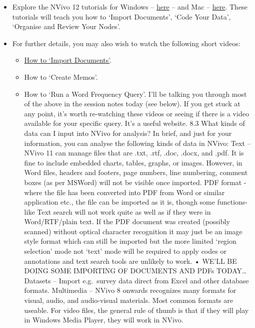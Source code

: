 \documentclass[
]{book}
\providecommand{\tightlist}{%
  \setlength{\itemsep}{0pt}\setlength{\parskip}{0pt}}
\begin{document}
\begin{itemize}
\item
  Explore the NVivo 12 tutorials for Windows -- \href{https://www.qsrinternational.com/nvivo/nvivo-12-tutorial-windows/00-let-s-get-started}{here} -- and Mac -- \href{https://www.qsrinternational.com/nvivo/nvivo-12-tutorial-mac/00-let-s-get-started}{here}. These tutorials will teach you how to `Import Documents', `Code Your Data', `Organise and Review Your Nodes'.
\item
  For further details, you may also wish to watch the following short videos:

  \begin{itemize}
  \tightlist
  \item
    \href{https://www.youtube.com/watch?v=68OOsulWjGM}{How to `Import Documents'}.
  \item
    How to `Create Memos'.
  \item
    How to `Run a Word Frequency Query'.
    I'll be talking you through most of the above in the session notes today (see below). If you get stuck at any point, it's worth re-watching these videos or seeing if there is a video available for your specific query. It's a useful website.
    8.3 What kinds of data can I input into NVivo for analysis?
    In brief, and just for your information, you can analyse the following kinds of data in NVivo:
    Text -- NVivo 11 can manage files that are .txt, .rtf, .doc, .docx, and .pdf. It is fine to include embedded charts, tables, graphs, or images. However, in Word files, headers and footers, page numbers, line numbering, comment boxes (as per MSWord) will not be visible once imported.
    PDF format - where the file has been converted into PDF from Word or similar application etc., the file can be imported as it is, though some functions- like Text search will not work quite as well as if they were in Word/RTF/plain text. If the PDF document was created (possibly scanned) without optical character recognition it may just be an image style format which can still be imported but the more limited `region selection' mode not `text' mode will be required to apply codes or annotations and text search tools are unlikely to work.
    • WE'LL BE DOING SOME IMPORTING OF DOCUMENTS AND PDFs TODAY\ldots{}
    Datasets -- Import e.g.~survey data direct from Excel and other database formats.
    Multimedia -- NVivo 8 onwards recognizes many formats for visual, audio, and audio-visual materials. Most common formats are useable. For video files, the general rule of thumb is that if they will play in Windows Media Player, they will work in NVivo.

\end{itemize}
\end{itemize}
\end{document}
